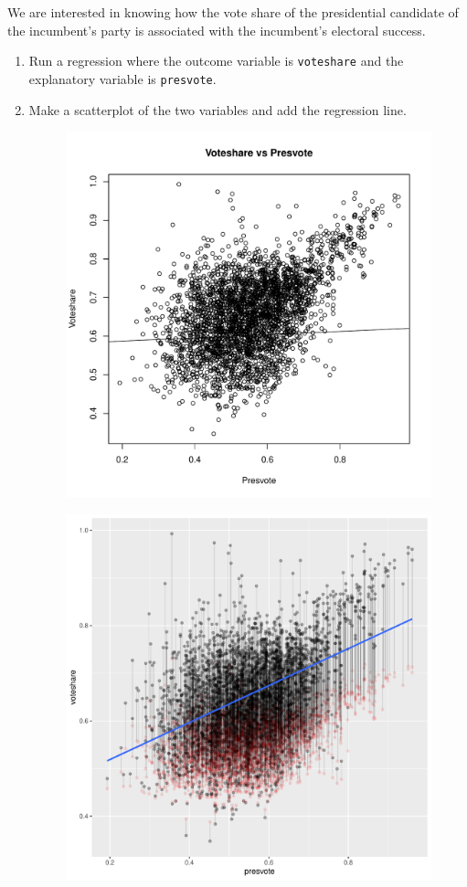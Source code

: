 \documentclass[12pt,letterpaper]{article}
\begin{document}
\noindent We are interested in knowing how the vote share of the presidential candidate of the incumbent's party is associated with the incumbent's electoral success.
	\vspace{.25cm}
	\begin{enumerate}
		\item Run a regression where the outcome variable is \texttt{voteshare} and the explanatory variable is \texttt{presvote}.
	
	
		\item Make a scatterplot of the two variables and add the regression line. 
		
			\begin{figure}[h!]\centering
					\caption{\footnotesize
					}\vspace{-1cm}
					\includegraphics[width=.75\textwidth]{plot_Q3_2.pdf}\\
			\end{figure}
			\begin{figure}[h!]\centering
				\caption{\footnotesize
				}\vspace{-1cm}
				\includegraphics[width=.75\textwidth]{plot_Q3_1.pdf}\\
		\end{figure}
	

\end{enumerate}
\end{document}
